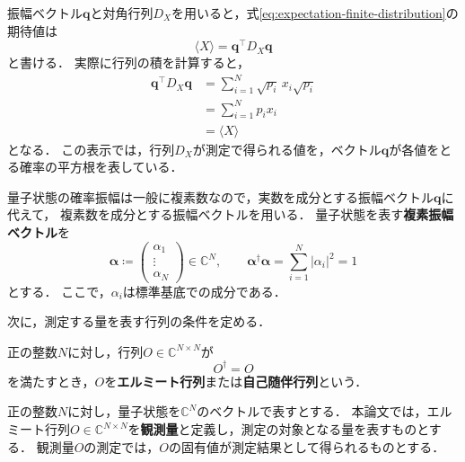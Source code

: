 振幅ベクトル$\bm{q}$と対角行列$D_X$を用いると，式\eqref{eq:expectation-finite-distribution}の期待値は
\begin{equation}
  \langle X\rangle=\bm{q}^\top D_X \bm{q}
  \label{eq:classical-expectation-matrix-form}
\end{equation}
と書ける．
実際に行列の積を計算すると，
\begin{equation*}
  \begin{aligned}
    \bm{q}^\top D_X \bm{q}
    &=\sum_{i=1}^{N}\sqrt{p_i}\,x_i\sqrt{p_i}\\
    &=\sum_{i=1}^{N}p_i x_i\\
    &=\langle X\rangle
  \end{aligned}
\end{equation*}
となる．
この表示では，行列$D_X$が測定で得られる値を，ベクトル$\bm{q}$が各値をとる確率の平方根を表している．

量子状態の確率振幅は一般に複素数なので，実数を成分とする振幅ベクトル$\bm{q}$に代えて，
複素数を成分とする振幅ベクトルを用いる．
量子状態を表す\textbf{複素振幅ベクトル}を
\begin{equation}
  \bm{\alpha}\coloneq
  \begin{pmatrix}\alpha_1\\\vdots\\\alpha_N\end{pmatrix}
  \in\mathbb C^N,
  \qquad
  \bm{\alpha}^{\dagger}\bm{\alpha}
  =\sum_{i=1}^{N}|\alpha_i|^2=1
  \label{eq:complex-amplitude-vector}
\end{equation}
とする．
ここで，$\alpha_i$は標準基底での成分である．

次に，測定する量を表す行列の条件を定める．

\begin{defi}[エルミート行列]
\label{def:hermitian-matrix}
正の整数$N$に対し，行列$O\in\mathbb C^{N\times N}$が
\begin{equation*}
  O^{\dagger}=O
\end{equation*}
を満たすとき，$O$を\textbf{エルミート行列}または\textbf{自己随伴行列}という\cite[p.~94]{schuld2020}．
\end{defi}

\begin{defi}[観測量]
\label{def:observable}
正の整数$N$に対し，量子状態を$\mathbb C^N$のベクトルで表すとする．
本論文では，エルミート行列$O\in\mathbb C^{N\times N}$を\textbf{観測量}と定義し，測定の対象となる量を表すものとする．
観測量$O$の測定では，$O$の固有値が測定結果として得られるものとする\cite[p.~95]{schuld2020}．
\end{defi}

